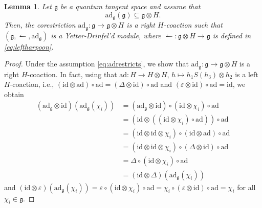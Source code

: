 \documentclass{article}
\newtheorem{lemma}[thm]{Lemma}
\theoremstyle{definition}
\begin{document}
	
	\begin{lemma}\label{lem:YD}
		Let $\mathfrak{g}$ be a quantum tangent space and assume that
		\begin{equation}\label{eq:adrestricts}
			\mathrm{ad}_\mathfrak{g}(\mathfrak{g})\subseteq\mathfrak{g}\otimes H.
		\end{equation}
		Then, the corestriction $\mathrm{ad}_\mathfrak{g}\colon\mathfrak{g}\to\mathfrak{g}\otimes H$ is a right $H$-coaction such that $(\mathfrak{g},\leftharpoonup,\mathrm{ad}_\mathfrak{g})$ is a Yetter-Drinfel'd module, where $\leftharpoonup\colon\mathfrak{g}\otimes H\to\mathfrak{g}$ is defined in \eqref{eq:leftharpoon}.
	\end{lemma}
	\begin{proof}
		Under the assumption \ref{eq:adrestricts}, we show that $\mathrm{ad}_\mathfrak{g}\colon\mathfrak{g}\to\mathfrak{g}\otimes H$ is a right $H$-coaction. In fact, using that $\mathrm{ad}\colon H\to H\otimes H$, $h\mapsto h_1S(h_3)\otimes h_2$ is a left $H$-coaction, i.e., $(\mathrm{id}\otimes\mathrm{ad})\circ\mathrm{ad}=(\Delta\otimes\mathrm{id})\circ\mathrm{ad}$ and $(\varepsilon\otimes\mathrm{id})\circ\mathrm{ad}=\mathrm{id}$, we obtain
		\begin{align*}
			(\mathrm{ad}_\mathfrak{g}\otimes\mathrm{id})(\mathrm{ad}_\mathfrak{g}(\chi_i))
			&=(\mathrm{ad}_\mathfrak{g}\otimes\mathrm{id})\circ(\mathrm{id}\otimes\chi_i)\circ\mathrm{ad}\\
			&=(\mathrm{id}\otimes((\mathrm{id}\otimes\chi_i)\circ\mathrm{ad}))\circ\mathrm{ad}\\
			&=(\mathrm{id}\otimes\mathrm{id}\otimes\chi_i)\circ(\mathrm{id}\otimes\mathrm{ad})\circ\mathrm{ad}\\
			&=(\mathrm{id}\otimes\mathrm{id}\otimes\chi_i)\circ(\Delta\otimes\mathrm{id})\circ\mathrm{ad}\\
			&=\Delta\circ(\mathrm{id}\otimes\chi_i)\circ\mathrm{ad}\\
			&=(\mathrm{id}\otimes\Delta)(\mathrm{ad}_\mathfrak{g}(\chi_i))
		\end{align*}
		and 
		$(\mathrm{id}\otimes\varepsilon)(\mathrm{ad}_\mathfrak{g}(\chi_i))
		=\varepsilon\circ(\mathrm{id}\otimes\chi_i)\circ\mathrm{ad}
		=\chi_i\circ(\varepsilon\otimes\mathrm{id})\circ\mathrm{ad}
		=\chi_i$ 
		for all $\chi_i\in\mathfrak{g}$.
		

\end{proof}
\end{document}
